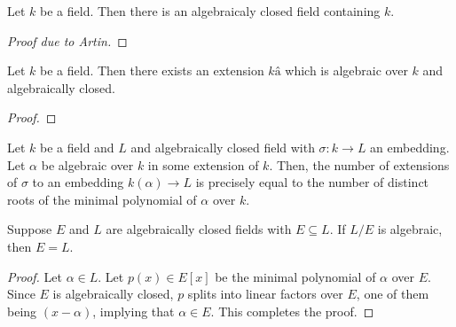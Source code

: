 \begin{theorem}
    Let $k$ be a field. Then there is an algebraicaly closed field containing $k$.
\end{theorem}
\begin{proof}[Proof due to Artin]
\end{proof}

\begin{corollary}
    Let $k$ be a field. Then there exists an extension $kâ$ which is algebraic over $k$ and algebraically closed.
\end{corollary}
\begin{proof}
    
\end{proof}

\begin{lemma}
    Let $k$ be a field and $L$ and algebraically closed field with $\sigma: k\to L$ an embedding. Let $\alpha$ be algebraic over $k$ in some extension of $k$. Then, the number of extensions of $\sigma$ to an embedding $k(\alpha)\to L$ is precisely equal to the number of distinct roots of the minimal polynomial of $\alpha$ over $k$.
\end{lemma}

\begin{lemma}
    Suppose $E$ and $L$ are algebraically closed fields with $E\subseteq L$. If $L/E$ is algebraic, then $E = L$.
\end{lemma}
\begin{proof}
    Let $\alpha\in L$. Let $p(x)\in E[x]$ be the minimal polynomial of $\alpha$ over $E$. Since $E$ is algebraically closed, $p$ splits into linear factors over $E$, one of them being $(x - \alpha)$, implying that $\alpha\in E$. This completes the proof.
\end{proof}

